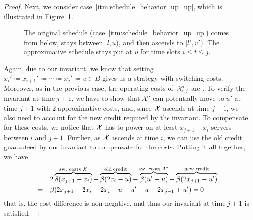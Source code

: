 \begin{proof}
Next, we consider case~\ref{itm:schedule_behavior_up_up}, which is illustrated in Figure~\ref{fig:schedule_behavior_up_up}.
\begin{figure}[ht]
\centering
	
\caption{The original schedule (case~\ref{itm:schedule_behavior_up_up}) comes from below, stays between $[l,u)$, and then ascends to $[l',u')$. The approximative schedule stays put at $u$ for time slots $i\le t\le j$.}
\label{fig:schedule_behavior_up_up}
\end{figure}
Again, due to our invariant, we know that setting $x_i'\coloneqq x_{i+1}'\coloneqq\dotsb\coloneqq x_j'\coloneqq u\in B$ gives us a strategy with  switching costs. Moreover, as in the previous case, the operating costs of~$\mathcal{X}_{i,j}'$ are . To verify the invariant at time $j+1$, we have to show that $\mathcal{X}'$ can potentially move to $u'$ at time $j+1$ with 2-approximative costs, and, since $\mathcal{X}$ ascends at time $j+1$, we also need to account for the new credit required by the invariant. To compensate for these costs, we notice that $\mathcal{X}$ has to power on at least $x_{j+1}-x_i$ servers between $i$ and $j+1$. Further, as $\mathcal{X}$ ascends at time $i$, we can use the old credit guaranteed by our invariant to compensate for the costs. Putting it all together, we have
\begin{align*}
	&2\overbrace{\beta(x_{j+1}-x_i)}^{\text{sw.\ costs }\mathcal{X}}+\overbrace{\beta(2x_i-u)}^{\text{old credit}}-\overbrace{\beta(u'-u)}^{\text{sw.\ costs }\mathcal{X}'}-\overbrace{\beta(2x_{j+1}-u')}^{\text{new credit}}\\
	=\quad&\beta(2x_{j+1}-2x_i+2x_i-u-u'+u-2x_{j+1}+u')=0
\end{align*}
that is, the cost difference is non-negative, and thus our invariant at time $j+1$ is satisfied.
	

\end{proof}
